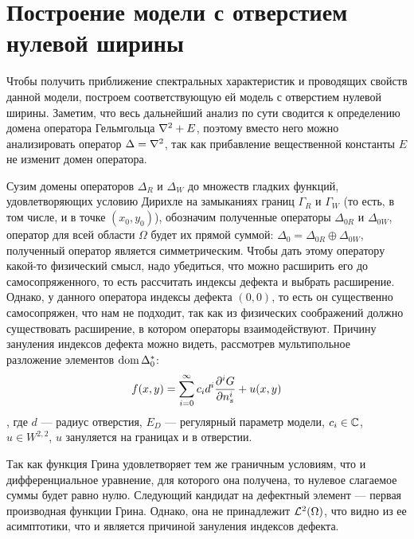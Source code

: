 \section{Построение модели с отверстием нулевой ширины}
Чтобы получить приближение спектральных характеристик и проводящих свойств данной модели, построем соответствующую ей модель с отверстием нулевой ширины. Заметим, что весь дальнейший анализ по сути сводится к определению домена оператора Гельмгольца $\laplacian + E$, поэтому вместо него можно анализировать оператор $\Delta = \laplacian$, так как прибавление вещественной константы $E$ не изменит домен оператора.

Сузим домены операторов $\Delta_R$ и $\Delta_W$ до множеств гладких функций, удовлетворяющих условию Дирихле на замыканиях границ $\Gamma_R$ и $\Gamma_W$ (то есть, в том числе, и в точке $(x_0, y_0)$), обозначим полученные операторы $\Delta_{0R}$ и $\Delta_{0W}$, оператор для всей области $\Omega$ будет их прямой суммой: $\Delta_0 = \Delta_{0R} \oplus \Delta_{0W}$, полученный оператор является симметрическим. Чтобы дать этому оператору какой-то физический смысл, надо убедиться, что можно расширить его до самосопряженного, то есть рассчитать индексы дефекта и выбрать расширение. Однако, у данного оператора индексы дефекта $(0, 0)$, то есть он существенно самосопряжен, что нам не подходит, так как из физических соображений должно существовать расширение, в котором операторы взаимодействуют. Причину зануления индексов дефекта можно видеть, рассмотрев мультипольное разложение элементов $\operatorname{dom} \Delta_0^*$:
\[
f(x, y) = \sum\limits_{i = 0}^\infty c_i d^i \pdv[i]{G}{n_s} (x, y, x_0, y_0; E_D) + u(x, y)
\]
, где $d$ — радиус отверстия, $E_D$ — регулярный параметр модели, $c_i \in \mathbb{C}$, $u \in W^{2, 2}$, $u$ зануляется на границах и в отверстии.

Так как функция Грина удовлетворяет тем же граничным условиям, что и дифференциальное уравнение, для которого она получена, то нулевое слагаемое суммы будет равно нулю. Следующий кандидат на дефектный элемент — первая производная функции Грина. Однако, она не принадлежит $\mathcal{L}^2(\Omega)$, что видно из ее асимптотики, что и является причиной зануления индексов дефекта.

